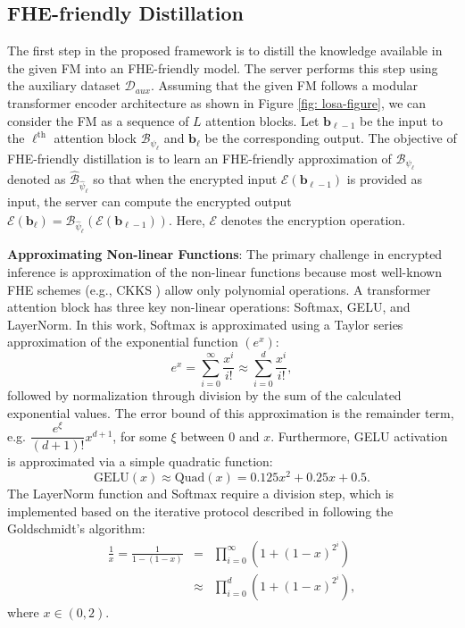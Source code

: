 \subsection{FHE-friendly Distillation}

The first step in the proposed framework is to distill the knowledge available in the given FM into an FHE-friendly model. The server performs this step using the auxiliary dataset $\mathcal{D}_{aux}$. Assuming that the given FM follows a modular transformer encoder architecture as shown in Figure \ref{fig: losa-figure}, we can consider the FM as a sequence of $L$ attention blocks. Let $\mathbf{b}_{\ell-1}$ be the input to the $\ell^{\text{th}}$ attention block $\mathcal{B}_{\psi_\ell}$ and $\mathbf{b}_{\ell}$ be the corresponding output. The objective of FHE-friendly distillation is to learn an FHE-friendly approximation of $\mathcal{B}_{\psi_\ell}$ denoted as $\widehat{\mathcal{B}}_{\widehat{\psi}_\ell}$ so that when the encrypted input $\mathcal{E}(\mathbf{b}_{\ell-1})$ is provided as input, the server can compute the encrypted output $\mathcal{E}(\mathbf{b}_{\ell}) = \widehat{\mathcal{B}}_{\widehat{\psi}_\ell}(\mathcal{E}(\mathbf{b}_{\ell-1}))$. Here, $\mathcal{E}$ denotes the encryption operation.

\noindent \textbf{Approximating Non-linear Functions}: The primary challenge in encrypted inference is approximation of the non-linear functions because most well-known FHE schemes (e.g., CKKS \cite{cheon2017homomorphic}) allow only polynomial operations. A transformer attention block has three key non-linear operations: Softmax, GELU, and LayerNorm. In this work, Softmax is approximated using a Taylor series approximation of the exponential function $(e^x)$: 
\begin{equation}
    e^x = \sum_{i=0}^{\infty} \frac{x^i}{i!} \approx \sum_{i=0}^d \frac{x^i}{i!},  
    \label{eq: exp-approx}
\end{equation}
followed by normalization through division by the sum of the calculated exponential values. The error bound of this approximation is the remainder term, e.g. $\dfrac{e^{\xi}}{(d+1)!} x^{d+1}$, for some $\xi$ between $0$ and $x$. Furthermore, GELU activation is approximated via a simple quadratic function: 
\begin{equation}
    \text{GELU}(x) \approx \text{Quad}(x) = 0.125x^2 + 0.25x + 0.5. 
    \label{eq: gelu-approx} 
\end{equation}
The LayerNorm function and Softmax require a division step, which is implemented based on the iterative protocol described in \cite{cheon2019numerical} following the Goldschmidt's algorithm: 
\begin{eqnarray}
    \frac{1}{x} = \frac{1}{1-(1-x)} &=& \prod_{i=0}^{\infty} \left(1+(1-x)^{2^i}\right) \nonumber \\ 
    &\approx& \prod_{i=0}^d \left( 1+(1-x)^{2^i} \right), \label{eq: division} 
\end{eqnarray}
where $x \in (0, 2)$. 

